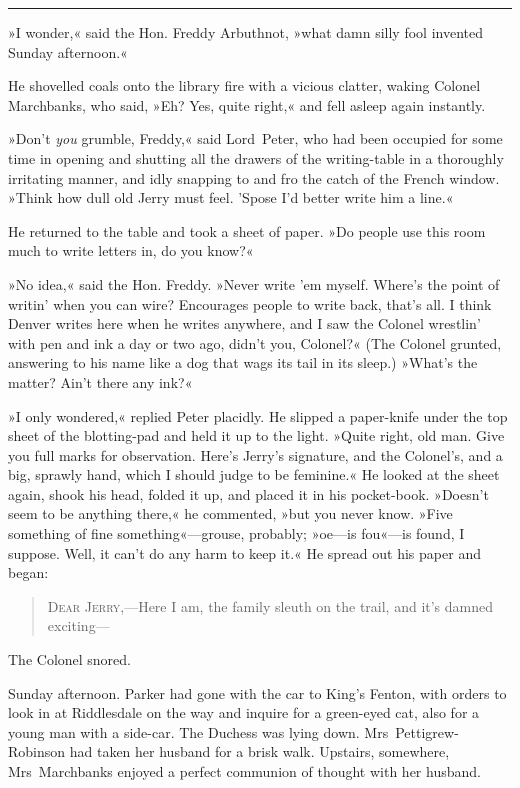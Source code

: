\noindent\hfil\rule{0.5\textwidth}{.4pt}\hfil

»I wonder,« said the Hon. Freddy Arbuthnot, »what damn silly fool invented Sunday afternoon.«

He shovelled coals onto the library fire with a vicious clatter, waking Colonel Marchbanks, who said, »Eh? Yes, quite right,« and fell asleep again instantly.

»Don't \textit{you} grumble, Freddy,« said Lord~Peter, who had been occupied for some time in opening and shutting all the drawers of the writing-table in a thoroughly irritating manner, and idly snapping to and fro the catch of the French window. »Think how dull old Jerry must feel. 'Spose I'd better write him a line.«

He returned to the table and took a sheet of paper. »Do people use this room much to write letters in, do you know?«

»No idea,« said the Hon. Freddy. »Never write 'em myself. Where's the point of writin' when you can wire? Encourages people to write back, that's all. I think Denver writes here when he writes anywhere, and I saw the Colonel wrestlin' with pen and ink a day or two ago, didn't you, Colonel?« (The Colonel grunted, answering to his name like a dog that wags its tail in its sleep.) »What's the matter? Ain't there any ink?«

»I only wondered,« replied Peter placidly. He slipped a paper-knife under the top sheet of the blotting-pad and held it up to the light.  »Quite right, old man. Give you full marks for observation. Here's Jerry's signature, and the Colonel's, and a big, sprawly hand, which I should judge to be feminine.« He looked at the sheet again, shook his head, folded it up, and placed it in his pocket-book. »Doesn't seem to be anything there,« he commented, »but you never know. »Five something of fine something«—grouse, probably; »oe—is fou«—is found, I suppose. Well, it can't do any harm to keep it.« He spread out his paper and began:

\begin{quote}
\textsc{Dear Jerry},—Here I am, the family sleuth on the trail, and it's damned exciting—
\end{quote}

The Colonel snored.

Sunday afternoon. Parker had gone with the car to King's Fenton, with orders to look in at Riddlesdale on the way and inquire for a green-eyed cat, also for a young man with a side-car. The Duchess was lying down. Mrs~Pettigrew-Robinson had taken her husband for a brisk walk. Upstairs, somewhere, Mrs~Marchbanks enjoyed a perfect communion of thought with her husband.

